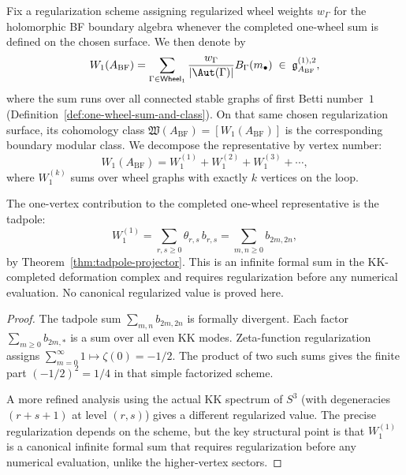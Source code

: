\begin{definition}
Fix a regularization scheme assigning regularized wheel weights $w_\Gamma$ for the
holomorphic BF boundary algebra whenever the completed one-wheel sum is defined on
the chosen surface. We then denote by
\begin{equation}
W_1(A_{\mathrm{BF}})
= \sum_{\Gamma \in \mathsf{Wheel}_1}
\frac{w_\Gamma}{|\Aut(\Gamma)|}
B_\Gamma(m_\bullet)
\;\in\; \mathfrak{g}^{(1),2}_{A_{\mathrm{BF}}},
\end{equation}
where the sum runs over all connected stable graphs of first Betti number~$1$
(Definition~\ref{def:one-wheel-sum-and-class}). On that same chosen regularization
surface, its cohomology class
$\mathfrak W(A_{\mathrm{BF}}) = [W_1(A_{\mathrm{BF}})]$ is the corresponding
boundary modular class. We decompose the representative by vertex number:
\begin{equation}
W_1(A_{\mathrm{BF}})
= W_1^{(1)} + W_1^{(2)} + W_1^{(3)} + \cdots,
\end{equation}
where $W_1^{(k)}$ sums over wheel graphs with exactly $k$ vertices on the loop.
\end{definition}

\begin{theorem}
The one-vertex contribution to the completed one-wheel representative is the
tadpole:
\begin{equation}
W_1^{(1)} = \sum_{r,s \geq 0} \theta_{r,s}\, b_{r,s}
= \sum_{m,n \geq 0} b_{2m,2n},
\end{equation}
by Theorem~\ref{thm:tadpole-projector}. This is an infinite formal sum in the
KK-completed deformation complex and requires regularization before any numerical
evaluation. No canonical regularized value is proved here.
\end{theorem}

\begin{proof}
The tadpole sum $\sum_{m,n} b_{2m,2n}$ is formally divergent. Each factor
$\sum_{m \geq 0} b_{2m, *}$ is a sum over all even KK modes. Zeta-function
regularization assigns $\sum_{m=0}^{\infty} 1 \mapsto \zeta(0) = -1/2$. The
product of two such sums gives the finite part $(-1/2)^2 = 1/4$ in that simple
factorized scheme.

A more refined analysis using the actual KK spectrum of $S^3$ (with degeneracies
$(r+s+1)$ at level $(r,s)$) gives a different regularized value. The precise
regularization depends on the scheme, but the key structural point is that $W_1^{(1)}$
is a canonical infinite formal sum that requires regularization before any
numerical evaluation, unlike the higher-vertex sectors.
\end{proof}

